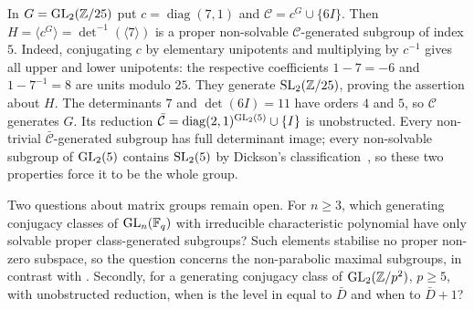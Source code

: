 \begin{remark}
\label{rem:congruence-supplement}
In $G=\operatorname{GL}_2(\mathbb{Z}/25)$ put $c=\operatorname{diag}(7,1)$ and
$\mathcal C=c^G\cup\{6I\}$. Then
$H=\langle c^G\rangle=\det^{-1}(\langle7\rangle)$ is a proper
non-solvable $\mathcal C$-generated subgroup of index $5$.
Indeed, conjugating $c$ by elementary unipotents and multiplying by
$c^{-1}$ gives all upper and lower unipotents: the respective
coefficients $1-7=-6$ and $1-7^{-1}=8$ are units modulo $25$.
They generate $\operatorname{SL}_2(\mathbb{Z}/25)$, proving the assertion about $H$.
The determinants $7$ and $\det(6I)=11$ have orders $4$ and $5$, so
$\mathcal C$ generates $G$.
Its reduction $\bar{\mathcal C}=\operatorname{diag}(2,1)^{\operatorname{GL}_2(5)}
\cup\{I\}$ is unobstructed. Every non-trivial
$\bar{\mathcal C}$-generated subgroup has full determinant image;
every non-solvable subgroup of $\operatorname{GL}_2(5)$ contains $\operatorname{SL}_2(5)$ by
Dickson's classification~\cite[Theorem 3.13]{Lombardo2015}, so these
two properties force it to be the whole group.
\end{remark}

\begin{remark}[Questions]
\label{rem:families-questions}
Two questions about matrix groups remain open. For $n\ge3$, which
generating conjugacy classes of $\operatorname{GL}_n(\mathbb{F}_q)$ with irreducible
characteristic polynomial have only solvable proper class-generated
subgroups? Such elements stabilise no proper non-zero subspace, so the
question concerns the non-parabolic maximal subgroups, in contrast with
. Secondly, for a generating conjugacy
class of $\operatorname{GL}_2(\mathbb{Z}/p^2)$, $p\ge5$, with unobstructed reduction, when is
the level in  equal to $\bar D$ and when to
$\bar D+1$?
\end{remark}
